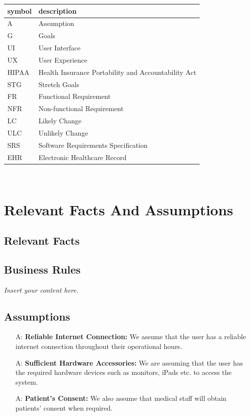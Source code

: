 \documentclass[12pt]{article}
\newcommand{\lips}{\textit{Insert your content here.}}
\newcounter{assumpnum} %
\begin{document}
\begin{tabular}{l l} 
  \toprule    
  \textbf{symbol} & \textbf{description}\\
  \midrule 
  A & Assumption\\
  G & Goals\\
  UI & User Interface\\
  UX & User Experience\\
  HIPAA & Health Insurance Portability and Accountability Act\\
  STG & Stretch Goals\\
  FR & Functional Requirement\\
  NFR & Non-functional Requirement\\
  LC & Likely Change\\
  ULC & Unlikely Change\\
  SRS & Software Requirements Specification\\
  EHR & Electronic Healthcare Record\\
  \bottomrule
\end{tabular}\\

\section{Relevant Facts And Assumptions}
\subsection{Relevant Facts}
\subsection{Business Rules}
\lips
\subsection{Assumptions}

\begin{itemize}
  \item[A\refstepcounter{assumpnum}\theassumpnum \label{A_reliableInternet}:] \textbf{Reliable Internet Connection:} We assume that the user has a reliable internet connection throughout their operational hours.
  \item[A\refstepcounter{assumpnum}\theassumpnum \label{A_sufficientHardware}:] \textbf{Sufficient Hardware Accessories:} We are assuming that the user has the required hardware devices such as monitors, iPads etc. to access the system.
  \item[A\refstepcounter{assumpnum}\theassumpnum \label{A_patientConsent}:] \textbf{Patient's Consent:} We also assume that medical staff will obtain patients' consent when required.  
\end{itemize}
\end{document}
